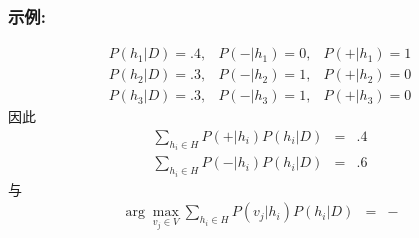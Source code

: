 \documentclass{beamer}
\begin{document}
\begin{frame}
\frametitle{示例:}
\label{sec-5-3}


\begin{eqnarray}
P(h_{1}|D)=.4, & P(-|h_{1})=0, & P(+|h_{1})=1 \nonumber \\
P(h_{2}|D)=.3, & P(-|h_{2})=1, & P(+|h_{2})=0 \nonumber \\
P(h_{3}|D)=.3, & P(-|h_{3})=1, & P(+|h_{3})=0 \nonumber 
\end{eqnarray}
因此
\begin{eqnarray}
\sum_{h_{i} \in H} P(+|h_{i}) P(h_{i}|D) & = & .4 \nonumber \\
\sum_{h_{i} \in H} P(-|h_{i}) P(h_{i}|D) & = & .6 \nonumber
\end{eqnarray}
与
\begin{eqnarray}
\arg \max_{v_{j} \in V} \sum_{h_{i} \in H} P(v_{j}|h_{i}) P(h_{i}|D) & = & -
\nonumber 
\end{eqnarray}
\end{frame}
\end{document}
